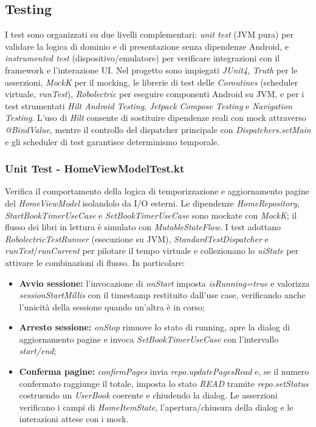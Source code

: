 \documentclass{article}
\begin{document}
\subsection{Testing}
I test sono organizzati su due livelli complementari: \textit{unit test} (JVM pura) per validare la logica di dominio e di presentazione senza dipendenze Android, e \textit{instrumented test} (dispositivo/emulatore) per verificare integrazioni con il framework e l’interazione UI. Nel progetto sono impiegati \textit{JUnit4}, \textit{Truth} per le asserzioni, \textit{MockK} per il mocking, le librerie di test delle \textit{Coroutines} (scheduler virtuale, \textit{runTest}), \textit{Robolectric} per eseguire componenti Android su JVM, e per i test strumentati \textit{Hilt Android Testing}, \textit{Jetpack Compose Testing} e \textit{Navigation Testing}. L’uso di \textit{Hilt} consente di sostituire dipendenze reali con mock attraverso \textit{@BindValue}, mentre il controllo del dispatcher principale con \textit{Dispatchers.setMain} e gli scheduler di test garantisce determinismo temporale.
\subsubsection{Unit Test - HomeViewModelTest.kt}
Verifica il comportamento della logica di temporizzazione e aggiornamento pagine del \textit{HomeViewModel} isolandolo da I/O esterni. Le dipendenze \textit{HomeRepository}, \textit{StartBookTimerUseCase} e \textit{SetBookTimerUseCase} sono mockate con \textit{MockK}; il flusso dei libri in lettura è simulato con \textit{MutableStateFlow}. I test adottano \textit{RobolectricTestRunner} (esecuzione su JVM), \textit{StandardTestDispatcher} e \textit{runTest}/\textit{runCurrent} per pilotare il tempo virtuale e collezionano lo \textit{uiState} per attivare le combinazioni di flusso.
In particolare:
\begin{itemize}
  \item \textbf{Avvio sessione:} l’invocazione di \textit{onStart} imposta \textit{isRunning=true} e valorizza \textit{sessionStartMillis} con il timestamp restituito dall’use case, verificando anche l’unicità della sessione quando un’altra è in corso; 
  \item \textbf{Arresto sessione:} \textit{onStop} rimuove lo stato di running, apre la dialog di aggiornamento pagine e invoca \textit{SetBookTimerUseCase} con l’intervallo \textit{start/end}; 
  \item \textbf{Conferma pagine:} \textit{confirmPages} invia \textit{repo.updatePagesRead} e, se il numero confermato raggiunge il totale, imposta lo stato \textit{READ} tramite \textit{repo.setStatus} costruendo un \textit{UserBook} coerente e chiudendo la dialog. Le asserzioni verificano i campi di \textit{HomeItemState}, l’apertura/chiusura della dialog e le interazioni attese con i mock.
\end{itemize} 
\end{document}
